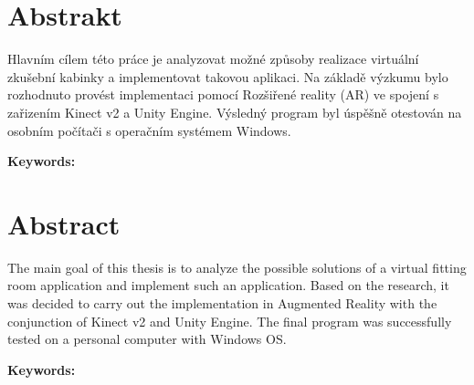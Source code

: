 \documentclass[a4paper]{report}
\begin{document}

\chapter*{Abstrakt}


\qquad Hlavním cílem této práce je analyzovat možné způsoby realizace virtuální zkušební kabinky a implementovat takovou aplikaci. Na základě výzkumu bylo rozhodnuto provést implementaci pomocí Rozšiřené reality (AR) ve spojení s zařizením Kinect v2 a Unity Engine. Výsledný program byl úspěšně otestován na osobním počítači s operačním systémem Windows.

\bigskip 
\bigskip 
\textbf{Keywords:}




\chapter*{Abstract}


\qquad The main goal of this thesis is to analyze the possible solutions of a virtual fitting room application and implement such an application. Based on the research, it was decided to carry out the implementation in Augmented Reality with the conjunction of Kinect v2 and Unity Engine. The final program was successfully tested on a personal computer with Windows OS.

\bigskip 
\bigskip 
\textbf{Keywords:}


\end{document}

